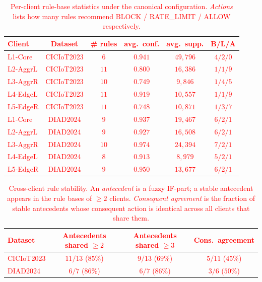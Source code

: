 \documentclass[journal]{IEEEtran}
\newcommand{\rev}[1]{\textcolor{red}{#1}}
\begin{document}
\begin{table}[!htbp]
\centering
\rev{\caption{Per-client rule-base statistics under the canonical configuration. \emph{Actions} lists how many rules recommend BLOCK / RATE\_LIMIT / ALLOW respectively.}\label{tab:rule_stats}}
\rev{\small
\begin{tabular}{@{}lccccc@{}}
\toprule
\textbf{Client} & \textbf{Dataset} & \textbf{\# rules} & \textbf{avg.\ conf.} & \textbf{avg.\ supp.} & \textbf{B/L/A} \\
\midrule
L1-Core       & CICIoT2023 & $6$  & $0.941$ & $49{,}796$ & $4/2/0$ \\
L2-AggrL      & CICIoT2023 & $11$ & $0.800$ & $16{,}386$ & $1/1/9$ \\
L3-AggrR      & CICIoT2023 & $10$ & $0.749$ & $9{,}846$  & $1/4/5$ \\
L4-EdgeL      & CICIoT2023 & $11$ & $0.919$ & $10{,}557$ & $1/1/9$ \\
L5-EdgeR      & CICIoT2023 & $11$ & $0.748$ & $10{,}871$ & $1/3/7$ \\
\midrule
L1-Core       & DIAD2024   & $9$  & $0.937$ & $19{,}467$ & $6/2/1$ \\
L2-AggrL      & DIAD2024   & $9$  & $0.927$ & $16{,}508$ & $6/2/1$ \\
L3-AggrR      & DIAD2024   & $10$ & $0.974$ & $24{,}394$ & $7/2/1$ \\
L4-EdgeL      & DIAD2024   & $8$  & $0.913$ & $8{,}979$  & $5/2/1$ \\
L5-EdgeR      & DIAD2024   & $9$  & $0.950$ & $13{,}677$ & $6/2/1$ \\
\bottomrule
\end{tabular}}
\end{table}

\begin{table}[!htbp]
\centering
\rev{\caption{Cross-client rule stability. An \emph{antecedent} is a fuzzy IF-part; a stable antecedent appears in the rule bases of $\geq 2$ clients. \emph{Consequent agreement} is the fraction of stable antecedents whose consequent action is identical across all clients that share them.}\label{tab:rule_stability}}
\rev{\small
\begin{tabular}{@{}lccc@{}}
\toprule
\textbf{Dataset} & \textbf{Antecedents shared $\geq 2$} & \textbf{Antecedents shared $\geq 3$} & \textbf{Cons.\ agreement} \\
\midrule
CICIoT2023 & $11/13$ ($85\%$) & $9/13$  ($69\%$) & $5/11$ ($45\%$) \\
DIAD2024   & $6/7$   ($86\%$) & $6/7$   ($86\%$) & $3/6$  ($50\%$) \\
\bottomrule
\end{tabular}}
\end{table}
\end{document}
